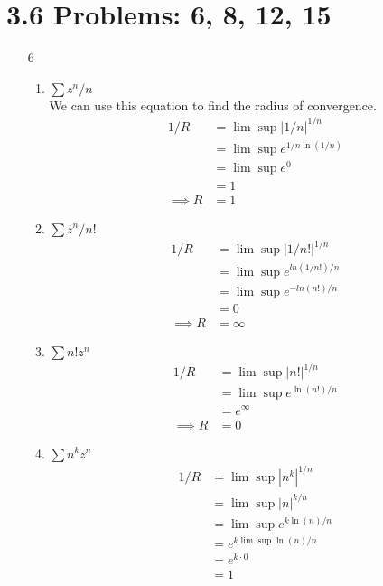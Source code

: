 \documentclass{article}
\begin{document}
  \section{3.6 Problems: 6, 8, 12, 15}
  \begin{enumerate}
    \item[6]
      \begin{enumerate}[label=(\roman*)]
        \item $\sum z^n/n$\\
        We can use this equation to find the radius of convergence.
        \begin{align*}
          1/R&=\lim\sup|1/n|^{1/n}\\
          &=\lim\sup e^{1/n\ln(1/n)}\\
          &=\lim\sup e^0\\
          &=1\\
          \implies R&=1
        \end{align*}
        \item $\sum z^n/n!$\\
        \begin{align*}
          1/R&=\lim\sup|1/n!|^{1/n}\\
          &=\lim\sup e^{ln(1/n!)/n}\\
          &=\lim\sup e^{-ln(n!)/n}\\
          &=0\\
          \implies R&=\infty
        \end{align*}
        \item $\sum n!z^n$\\
        \begin{align*}
          1/R&=\lim\sup|n!|^{1/n}\\
          &=\lim\sup e^{\ln(n!)/n}\\
          &=e^\infty\\
          \implies R&=0
        \end{align*}
        \item $\sum n^kz^n$\\
        \begin{align*}
          1/R&=\lim\sup |n^k|^{1/n}\\
          &=\lim\sup |n|^{k/n}\\
          &=\lim\sup e^{k\ln(n)/n}\\
          &=e^{k\lim\sup\ln(n)/n}\\
          &=e^{k\cdot 0}\\
          &=1\\

\end{align*}
\end{enumerate}
\end{enumerate}
\end{document}
